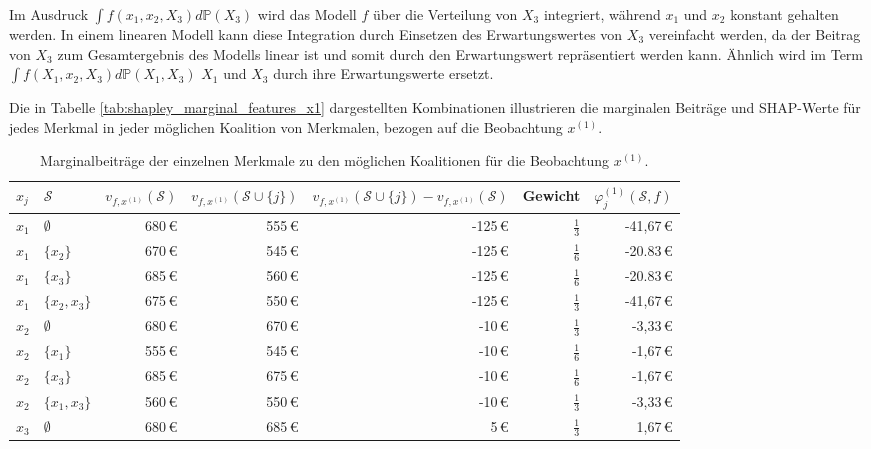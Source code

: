 Im Ausdruck $\int f(x_1, x_2, X_3) d\mathbb{P}(X_3)$ wird das Modell $f$ über die Verteilung von $X_3$ integriert, 
während $x_1$ und $x_2$ konstant gehalten werden. In einem linearen Modell kann diese Integration durch Einsetzen des 
Erwartungswertes von $X_3$ vereinfacht werden, da der Beitrag von $X_3$ zum Gesamtergebnis des Modells linear ist und 
somit durch den Erwartungswert repräsentiert werden kann. Ähnlich wird im Term $\int f(X_1, x_2, X_3) d\mathbb{P}(X_1, X_3)$ $X_1$ und $X_3$ 
durch ihre Erwartungswerte ersetzt.

Die in Tabelle \ref{tab:shapley_marginal_features_x1} dargestellten Kombinationen illustrieren die marginalen Beiträge und SHAP-Werte 
für jedes Merkmal in jeder möglichen Koalition von Merkmalen, bezogen auf die Beobachtung $x^{(1)}$. 

\begin{table}[!h]
    \caption{Marginalbeiträge der einzelnen Merkmale zu den möglichen Koalitionen für die Beobachtung $x^{(1)}$.}
    \footnotesize
    \begin{tabularx}{\textwidth}{XXrrrrr}
    \toprule
    $x_{j}$ & $\mathcal{S}$ & $v_{f, x^{(1)}}(\mathcal{S})$ & $v_{f, x^{(1)}}(\mathcal{S} \cup \{j\})$ & $v_{f, x^{(1)}}(\mathcal{S} \cup \{j\}) - v_{f, x^{(1)}}(\mathcal{S})$ & Gewicht & $\varphi_{j}^{(1)}(\mathcal{S}, f)$\\
    \midrule
    $x_1$ & $\emptyset$ & 680\,\euro{} & 555\,\euro{} & -125\,\euro{} & $\frac{1}{3}$ & -41,67\,\euro{} \\
    $x_1$ & $\{x_2\}$ & 670\,\euro{} & 545\,\euro{} & -125\,\euro{} & $\frac{1}{6}$ & -20.83\,\euro{} \\
    $x_1$ & $\{x_3\}$ & 685\,\euro{} & 560\,\euro{} & -125\,\euro{} & $\frac{1}{6}$ & -20.83\,\euro{} \\
    $x_1$ & $\{x_2, x_3\}$ & 675\,\euro{} & 550\,\euro{} & -125\,\euro{} & $\frac{1}{3}$ & -41,67\,\euro{} \\
    $x_2$ & $\emptyset$ & 680\,\euro{} & 670\,\euro{} & -10\,\euro{} & $\frac{1}{3}$ & -3,33\,\euro{} \\
    $x_2$ & $\{x_1\}$ & 555\,\euro{} & 545\,\euro{} & -10\,\euro{} & $\frac{1}{6}$ & -1,67\,\euro{} \\
    $x_2$ & $\{x_3\}$ & 685\,\euro{} & 675\,\euro{} & -10\,\euro{} & $\frac{1}{6}$ & -1,67\,\euro{} \\
    $x_2$ & $\{x_1, x_3\}$ & 560\,\euro{} & 550\,\euro{} & -10\,\euro{} & $\frac{1}{3}$ & -3,33\,\euro{} \\
    $x_3$ & $\emptyset$ & 680\,\euro{} & 685\,\euro{} & 5\,\euro{} & $\frac{1}{3}$ & 1,67\,\euro{} \\

\end{tabularx}
\end{table}
